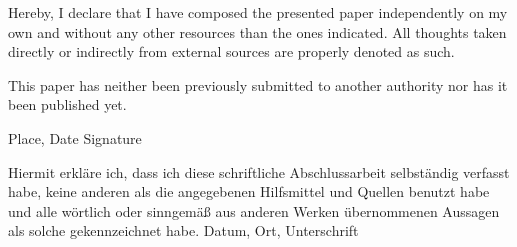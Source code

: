 \documentclass[12pt,a4paper]{report}
\begin{document}
Hereby, I declare that I have composed the presented paper independently on my own and without any other resources than the ones indicated. All thoughts taken directly or indirectly from external sources are properly denoted as such.

This paper has neither been previously submitted to another authority nor has it been published yet.
\vskip 3cm

Place, Date	\hfill Signature \hfill

Hiermit erkläre ich, dass ich diese schriftliche Abschlussarbeit selbständig verfasst habe,
keine anderen als die angegebenen Hilfsmittel und Quellen benutzt habe und alle wörtlich
oder sinngemäß aus anderen Werken übernommenen Aussagen als solche gekennzeichnet
habe.
Datum, Ort, \hfill Unterschrift \hfill

\newpage

\renewcommand{\baselinestretch}{1.3}
\small\normalsize

\tableofcontents

\renewcommand{\baselinestretch}{1}
\small\normalsize

\newpage


\setcounter{page}{1}


\newpage


\newpage


\newpage


\newpage


\newpage


\newpage

\end{document}
